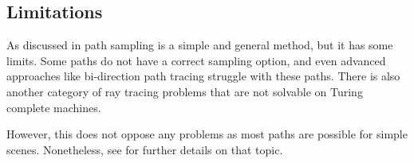 \subsection{Limitations}

As discussed in \cite{veach_robust_1997} path sampling is a simple and general method, but it has some limits.
Some paths do not have a correct sampling option, and even advanced approaches like bi-direction path tracing struggle with these paths.
There is also another category of ray tracing problems that are not solvable on Turing complete machines.

However, this does not oppose any problems as most paths are possible for simple scenes.
Nonetheless, see \cite{veach_robust_1997} for further details on that topic.


